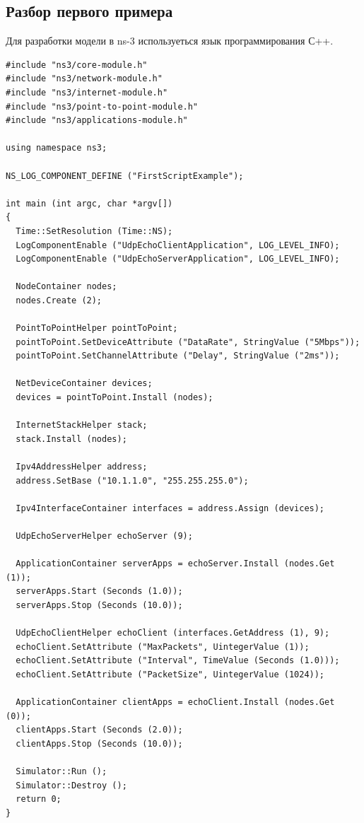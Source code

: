 \documentclass[14pt,a4paper]{article}
\begin{document}
\subsection{Разбор первого примера}
Для разработки модели в ns-3 используеться язык программирования С++.
\begin{verbatim}
#include "ns3/core-module.h"
#include "ns3/network-module.h"
#include "ns3/internet-module.h"
#include "ns3/point-to-point-module.h"
#include "ns3/applications-module.h"

using namespace ns3;

NS_LOG_COMPONENT_DEFINE ("FirstScriptExample");

int main (int argc, char *argv[])
{
  Time::SetResolution (Time::NS);
  LogComponentEnable ("UdpEchoClientApplication", LOG_LEVEL_INFO);
  LogComponentEnable ("UdpEchoServerApplication", LOG_LEVEL_INFO);

  NodeContainer nodes;
  nodes.Create (2);

  PointToPointHelper pointToPoint;
  pointToPoint.SetDeviceAttribute ("DataRate", StringValue ("5Mbps"));
  pointToPoint.SetChannelAttribute ("Delay", StringValue ("2ms"));

  NetDeviceContainer devices;
  devices = pointToPoint.Install (nodes);

  InternetStackHelper stack;
  stack.Install (nodes);

  Ipv4AddressHelper address;
  address.SetBase ("10.1.1.0", "255.255.255.0");

  Ipv4InterfaceContainer interfaces = address.Assign (devices);

  UdpEchoServerHelper echoServer (9);

  ApplicationContainer serverApps = echoServer.Install (nodes.Get (1));
  serverApps.Start (Seconds (1.0));
  serverApps.Stop (Seconds (10.0));

  UdpEchoClientHelper echoClient (interfaces.GetAddress (1), 9);
  echoClient.SetAttribute ("MaxPackets", UintegerValue (1));
  echoClient.SetAttribute ("Interval", TimeValue (Seconds (1.0)));
  echoClient.SetAttribute ("PacketSize", UintegerValue (1024));

  ApplicationContainer clientApps = echoClient.Install (nodes.Get (0));
  clientApps.Start (Seconds (2.0));
  clientApps.Stop (Seconds (10.0));

  Simulator::Run ();
  Simulator::Destroy ();
  return 0;
}

\end{verbatim} 
\end{document}
